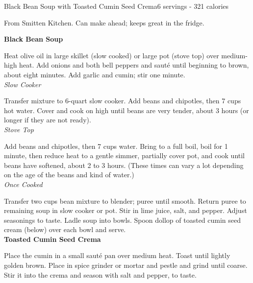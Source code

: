 \begin{recipe}{Black Bean Soup with Toasted Cumin Seed Crema}{6 servings - 321 calories}{}

\freeform From Smitten Kitchen. Can make ahead; keeps great in the fridge.


\textbf{Black Bean Soup}

Heat olive oil in large skillet (slow cooked) or large pot (stove top) over medium-high heat. Add onions and both bell peppers and sauté until beginning to brown, about eight minutes. Add garlic and cumin; stir one minute.\\

\textit{Slow Cooker}

Transfer mixture to 6-quart slow cooker. Add beans and chipotles, then 7 cups hot water. Cover and cook on high until beans are very tender, about 3 hours (or longer if they are not ready).\\

\textit{Stove Top}

Add beans and chipotles, then 7 cups water. Bring to a full boil, boil for 1 minute, then reduce heat to a gentle simmer, partially cover pot, and cook until beans have softened, about 2 to 3 hours. (These times can vary a lot depending on the age of the beans and kind of water.)\\

\textit{Once Cooked}

Transfer two cups bean mixture to blender; puree until smooth. Return puree to remaining soup in slow cooker or pot. Stir in lime juice, salt, and pepper. Adjust seasonings to taste. Ladle soup into bowls. Spoon dollop of toasted cumin seed cream (below) over each bowl and serve.\\

\textbf{Toasted Cumin Seed Crema}

Place the cumin in a small sauté pan over medium heat. Toast until lightly golden brown. Place in spice grinder or mortar and pestle and grind until coarse. Stir it into the crema and season with salt and pepper, to taste.

\end{recipe}